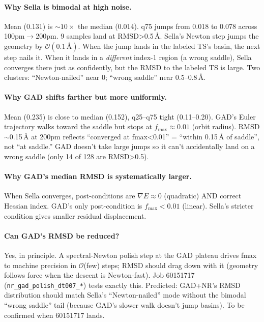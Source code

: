 \documentclass[11pt]{article}
\begin{document}
\paragraph{Why Sella is bimodal at high noise.} Mean (0.131) is
$\sim10\!\times$ the median (0.014). q75 jumps from 0.018 to 0.078
across 100pm$\to$200pm. 9 samples land at RMSD>0.5\,\AA. Sella's Newton
step jumps the geometry by $\mathcal{O}(0.1\,\text{\AA})$. When the jump
lands in the labeled TS's basin, the next step nails it. When it lands
in a \emph{different} index-1 region (a wrong saddle), Sella converges
there just as confidently, but the RMSD to the labeled TS is large.
Two clusters: ``Newton-nailed'' near 0; ``wrong saddle'' near 0.5--0.8\,\AA.

\paragraph{Why GAD shifts farther but more uniformly.} Mean (0.235) is
close to median (0.152), q25--q75 tight (0.11--0.20). GAD's Euler
trajectory walks toward the saddle but stops at $f_{\max}\!\approx\!0.01$
(orbit radius). RMSD$\sim$0.15\,\AA{} at 200pm reflects ``converged at
fmax<0.01'' = ``within 0.15\,\AA{} of saddle'', not ``at saddle.''
GAD doesn't take large jumps so it can't accidentally land on a wrong
saddle (only 14 of 128 are RMSD>0.5).

\paragraph{Why GAD's median RMSD is systematically larger.} When Sella
converges, post-conditions are $\nabla E \approx 0$ (quadratic) AND
correct Hessian index. GAD's only post-condition is $f_{\max}<0.01$
(linear). Sella's stricter condition gives smaller residual displacement.

\paragraph{Can GAD's RMSD be reduced?} Yes, in principle. A
spectral-Newton polish step at the GAD plateau drives fmax to machine
precision in $\mathcal{O}$(few) steps; RMSD should drag down with it
(geometry follows force when the descent is Newton-fast). Job 60151717
(\texttt{nr\_gad\_polish\_dt007\_*}) tests exactly this. Predicted:
GAD+NR's RMSD distribution should match Sella's ``Newton-nailed'' mode
without the bimodal ``wrong saddle'' tail (because GAD's slower walk
doesn't jump basins). To be confirmed when 60151717 lands.
\end{document}
